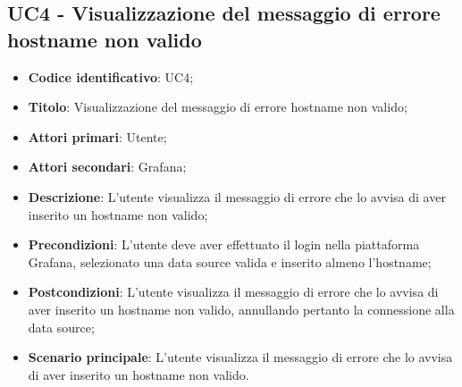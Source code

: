 \subsection{UC4 - Visualizzazione del messaggio di errore hostname non valido}
\begin{itemize}
    \item \textbf{Codice identificativo}: UC4;
    \item \textbf{Titolo}: Visualizzazione del messaggio di errore hostname non valido;
    \item \textbf{Attori primari}: Utente;
    \item \textbf{Attori secondari}: Grafana\glo;
    \item \textbf{Descrizione}: L'utente visualizza il messaggio di errore che lo avvisa di aver inserito un hostname non valido;
    \item \textbf{Precondizioni}: L'utente deve aver effettuato il login nella piattaforma Grafana\glo, selezionato una data source valida e inserito almeno l'hostname;
    \item \textbf{Postcondizioni}: L'utente visualizza il messaggio di errore che lo avvisa di aver inserito un hostname non valido, annullando pertanto la connessione                                  alla data source;
    \item \textbf{Scenario principale}: L'utente visualizza il messaggio di errore che lo avvisa di aver inserito un hostname non valido.
\end{itemize}
